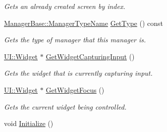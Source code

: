 \begin{DoxyCompactItemize}
\begin{DoxyCompactList}\small\item\em Gets an already created screen by index. \item\end{DoxyCompactList}\item 
\hyperlink{classMezzanine_1_1ManagerBase_a08cecf5169cad3e82be81a3a159b0b6e}{ManagerBase::ManagerTypeName} \hyperlink{classMezzanine_1_1UIManager_a0a576d8f14aa475d9f1750b4cf76cf10}{GetType} () const 
\begin{DoxyCompactList}\small\item\em Gets the type of manager that this manager is. \item\end{DoxyCompactList}\item 
\hyperlink{classMezzanine_1_1UI_1_1Widget}{UI::Widget} $\ast$ \hyperlink{classMezzanine_1_1UIManager_ac4fda10f2f5af5df7ecbc089eb1ee359}{GetWidgetCapturingInput} ()
\begin{DoxyCompactList}\small\item\em Gets the widget that is currently capturing input. \item\end{DoxyCompactList}\item 
\hyperlink{classMezzanine_1_1UI_1_1Widget}{UI::Widget} $\ast$ \hyperlink{classMezzanine_1_1UIManager_a57b306a3fca917e2dfa1c05ca87f6262}{GetWidgetFocus} ()
\begin{DoxyCompactList}\small\item\em Gets the current widget being controlled. \item\end{DoxyCompactList}\item 
\hypertarget{classMezzanine_1_1UIManager_a51dc53c08ac8657133279e75fbce466a}{
void \hyperlink{classMezzanine_1_1UIManager_a51dc53c08ac8657133279e75fbce466a}{Initialize} ()}
\label{classMezzanine_1_1UIManager_a51dc53c08ac8657133279e75fbce466a}


\end{DoxyCompactItemize}
